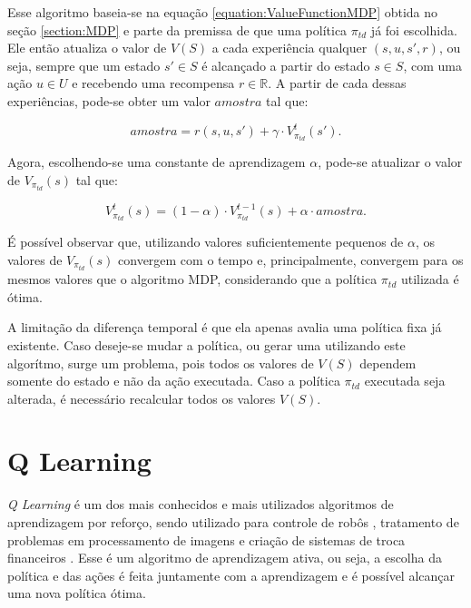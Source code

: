 Esse algoritmo baseia-se na equação \ref{equation:ValueFunctionMDP} obtida no seção \ref{section:MDP} e parte da premissa de que uma política $ \pi_{td} $ já foi escolhida. Ele então atualiza o valor de $ V \left( S \right) $ a cada experiência qualquer $ \left( s, u, s', r \right) $, ou seja, sempre que um estado $ s' \in S $ é alcançado a partir do estado $ s \in S $, com uma ação $ u \in U $ e recebendo uma recompensa $ r \in \mathbb{R} $. A partir de cada dessas experiências, pode-se obter um valor $ amostra $ tal que:

\begin{equation} \label{equation:AmostraTD}
	amostra = r \left( s, u, s' \right) + \gamma \cdot V_{\pi_{td}}^t \left( s' \right).
\end{equation}

Agora, escolhendo-se uma constante de aprendizagem $ \alpha $, pode-se atualizar o valor de $ V_{\pi_{td}} \left( s \right) $ tal que:

\begin{equation} \label{equation:UpdateValueFunctionTD}
	V_{\pi_{td}}^t \left( s \right) = \left( 1 - \alpha \right) \cdot V_{\pi_{td}}^{t-1} \left( s \right) + \alpha \cdot amostra.
\end{equation}

É possível observar que, utilizando valores suficientemente pequenos de $ \alpha $, os valores de $ V_{\pi_{td}} \left( s \right) $ convergem com o tempo e, principalmente, convergem para os mesmos valores que o algoritmo MDP, considerando que a política $ \pi_{td} $ utilizada é ótima.

A limitação da diferença temporal é que ela apenas avalia uma política fixa já existente. Caso deseje-se mudar a política, ou gerar uma utilizando este algorítmo, surge um problema, pois todos os valores de $ V \left( S \right) $ dependem somente do estado e não da ação executada. Caso a política $ \pi_{td} $ executada seja alterada, é necessário recalcular todos os valores $ V \left( S \right) $.

\section{Q Learning} \label{section:QLearning}

\textit{Q Learning} é um dos mais conhecidos e mais utilizados algoritmos de aprendizagem por reforço, sendo utilizado para controle de robôs \cite{Gaskett:2002}, tratamento de problemas em processamento de imagens \cite{Alexandru-Learning} e criação de sistemas de troca financeiros \cite{RePEc:ven:wpaper:2014:15}. Esse é um algoritmo de aprendizagem ativa, ou seja, a escolha da política e das ações é feita juntamente com a aprendizagem e é possível alcançar uma nova política ótima.

